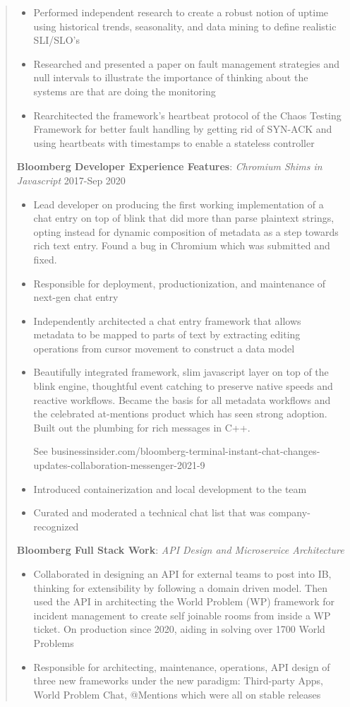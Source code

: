 \documentclass[11pt,a4paper]{article}
\begin{document}
\begin{quote}
\begin{itemize}
\item Performed independent research to create a robust notion of uptime using
historical trends, seasonality, and data mining to define realistic
SLI/SLO's
\item Researched and presented a paper on fault management strategies and null
intervals to illustrate the importance of thinking about the systems are
that are doing the monitoring
\item Rearchitected the framework's heartbeat protocol of the Chaos Testing
Framework for better fault handling by getting rid of SYN-ACK and using
heartbeats with timestamps to enable a stateless controller
\end{itemize}

\textbf{Bloomberg Developer Experience Features}: \emph{Chromium Shims
in Javascript} 2017-Sep 2020
\begin{itemize}
\item Lead developer on producing the first working implementation of a chat
entry on top of blink that did more than parse plaintext strings, opting
instead for dynamic composition of metadata as a step towards rich text
entry. Found a bug in Chromium which was submitted and fixed.

\item Responsible for deployment, productionization, and maintenance of
next-gen chat entry
\item Independently architected a chat entry framework that allows metadata to
be mapped to parts of text by extracting editing operations from cursor
movement to construct a data model
\item Beautifully integrated framework, slim javascript layer on top of the
blink engine, thoughtful event catching to preserve native speeds and
reactive workflows. Became the basis for all metadata workflows and the
celebrated at-mentions product which has seen strong adoption. Built out
the plumbing for rich messages in C++.

See
businessinsider.com/bloomberg-terminal-instant-chat-changes-updates-collaboration-messenger-2021-9
\item Introduced containerization and local development to the team
\item Curated and moderated a technical chat list that was company-recognized
\end{itemize}

\textbf{Bloomberg Full Stack Work}: \emph{API Design and Microservice
Architecture}
\begin{itemize}
\item Collaborated in designing an API for external teams to post into IB,
thinking for extensibility by following a domain driven model. Then used
the API in architecting the World Problem (WP) framework for incident
management to create self joinable rooms from inside a WP ticket. On
production since 2020, aiding in solving over 1700 World Problems
\item Responsible for architecting, maintenance, operations, API design of
three new frameworks under the new paradigm: Third-party Apps, World
Problem Chat, @Mentions which were all on stable releases
\end{itemize}


\end{quote}
\end{document}

